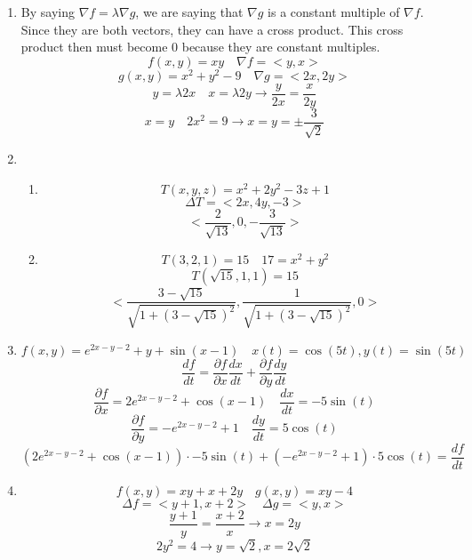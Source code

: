 \documentclass[12pt]{article}
\begin{document}
\maketitle \begin{enumerate}

\item By saying $\nabla f = \lambda \nabla g$, we are saying that $\nabla g$ is a constant multiple of $\nabla f$. Since they are both vectors, they can have a cross product. This cross product then must become 0 because they are constant multiples.
$$f(x,y)=xy \quad \nabla f = <y,x>$$
$$g(x,y)=x^2+y^2-9 \quad \nabla g = <2x,2y>$$
$$y=\lambda 2x \quad x=\lambda 2 y \rightarrow \frac{y}{2x} = \frac{x}{2y}$$
$$x=y \quad 2x^2=9 \rightarrow x = y = \pm \frac{3}{\sqrt{2}}$$

\item \begin{enumerate}
\item 
$$T(x, y, z) = x^2 +2y^2 - 3z + 1$$
$$\Delta T  = <2x, 4y, -3>$$
$$<\frac{2}{\sqrt{13}}, 0, -\frac{3}{\sqrt{13}}>$$
\item $$T(3, 2, 1) = 15 \quad 17 = x^2 + y^2$$
$$T(\sqrt{15},1, 1) = 15$$
$$<\frac{3-\sqrt{15}}{\sqrt{1+(3-\sqrt{15})^2}}, \frac{1}{\sqrt{1+(3-\sqrt{15})^2}}, 0>$$
\end{enumerate}

\item $$f(x, y) = e^{2x-y-2}+y+\sin(x-1) \quad x(t) = \cos (5t), y(t) = \sin (5t)$$
$$\frac{df}{dt} = \frac{\partial f}{\partial x} \frac{dx}{dt} + \frac{\partial f}{\partial y} \frac{dy}{dt}$$
$$\frac{\partial f}{\partial x} = 2e^{2x-y-2}+\cos(x-1) \quad \frac{dx}{dt} = -5\sin(t)$$
$$\frac{\partial f}{\partial y} = -e^{2x-y-2}+1 \quad \frac{dy}{dt} = 5\cos(t)$$
$$\left(2e^{2x-y-2}+\cos(x-1)\right)\cdot-5\sin(t) + \left(-e^{2x-y-2}+1\right)\cdot5\cos(t) = \frac{df}{dt}$$

\item $$f(x, y) = xy + x + 2y \quad g(x, y) = xy - 4$$
$$\Delta f = <y+1,x+2> \quad \Delta g = <y, x>$$
$$\frac{y+1}{y} = \frac{x+2}{x} \rightarrow x=2y$$
$$2y^2=4 \rightarrow y=\sqrt{2}, x = 2\sqrt{2}$$


\end{enumerate}
\end{document}
